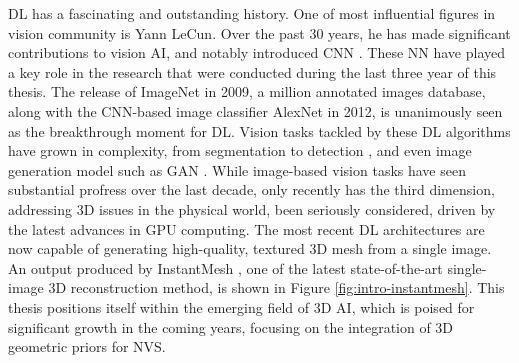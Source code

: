 \ac{DL} has a fascinating and outstanding history. One of most influential figures in vision community is Yann LeCun. Over the past 30 years, he has made significant contributions to vision \ac{AI}, and notably introduced \ac{CNN} \citep{lecun1998gradient}. These \ac{NN} have played a key role in the research that were conducted during the last three year of this thesis. The release of ImageNet \citep{deng2009imagenet} in 2009, a million annotated images database, along with the \ac{CNN}-based image classifier AlexNet \citep{krizhevsky2012imagenet} in 2012, is unanimously seen as the breakthrough moment for \ac{DL}. Vision tasks tackled by these \ac{DL} algorithms have grown in complexity, from segmentation \citep{long2015fully} to detection \citep{girshick2015fast}, and even image generation model such as \ac{GAN} \citep{goodfellow2014generative}. While image-based vision tasks have seen substantial profress over the last decade, only recently has the third dimension, addressing 3D issues in the physical world, been seriously considered, driven by the latest advances in \ac{GPU} computing. The most recent \ac{DL} architectures are now capable of generating high-quality, textured 3D mesh from a single image. An output produced by InstantMesh \citep{xu2024instantmesh}, one of the latest state-of-the-art single-image 3D reconstruction method, is shown in Figure \ref{fig:intro-instantmesh}. This thesis positions itself within the emerging field of 3D \ac{AI}, which is poised for significant growth in the coming years, focusing on the integration of 3D geometric priors for \ac{NVS}.  



